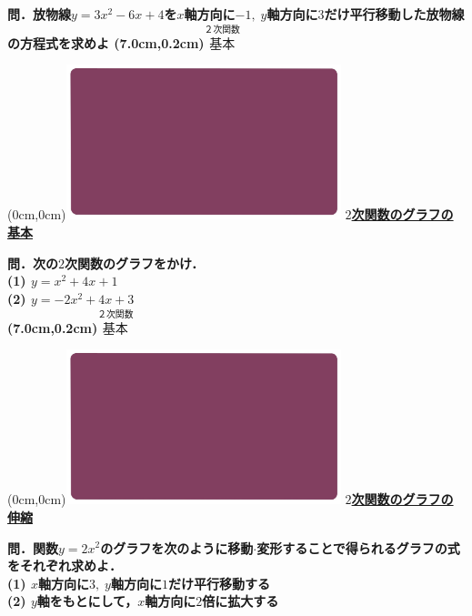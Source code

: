 \documentclass[10pt,
fleqn,
dvipdfmx,
uplatex
]{jsarticle}
\begin{document}
\Large 
\bf\boldmath 問．放物線$y=3x^2-6x+4$を$x$軸方向に$-1,\;y$軸方向に$3$だけ平行移動した放物線の方程式を求めよ
\at(7.0cm,0.2cm){\small\color{bradorange}$\overset{\text{２次関数}}{\text{基本}}$}


\newpage



\at(0cm,0cm){\includegraphics[width=8cm,bb=0 0 1920 1080]{./youtube/thumbnails/templates/smart_background/２次関数.jpeg}}
{\color{orange}\bf\boldmath\LARGE\underline{$2$次関数のグラフの基本}}\vspace{0.3zw}

\Large 
\bf\boldmath 問．次の$2$次関数のグラフをかけ．\\
(1)  $y=x^2+4x+1$\\
(2)  $y=-2x^2+4x+3$\\

\at(7.0cm,0.2cm){\small\color{bradorange}$\overset{\text{２次関数}}{\text{基本}}$}


\newpage



\at(0cm,0cm){\includegraphics[width=8cm,bb=0 0 1920 1080]{./youtube/thumbnails/templates/smart_background/２次関数.jpeg}}
{\color{orange}\bf\boldmath\LARGE\underline{$2$次関数のグラフの伸縮}}\vspace{0.3zw}

\normalsize 
\bf\boldmath 問．関数$y=2x^2$のグラフを次のように移動$\cdot$変形することで得られるグラフの式をそれぞれ求めよ．\\
(1)  $x$軸方向に$3,\;y$軸方向に$1$だけ平行移動する\\
(2)  $y$軸をもとにして，$x$軸方向に$2$倍に拡大する\\
\end{document}
